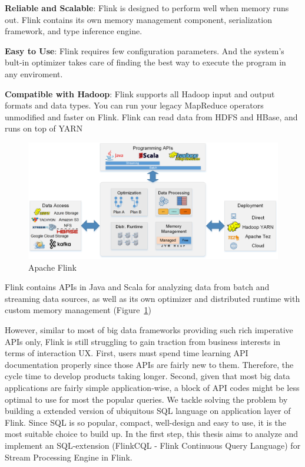\textbf{Reliable and Scalable}: Flink is designed to perform well when memory runs out.  Flink contains its own memory management component, serialization framework, and type inference engine.

\textbf{Easy to Use}: Flink requires few configuration parameters. And the system's bult-in optimizer takes care of finding the best way to execute the program in any enviroment.

\textbf{Compatible with Hadoop}: Flink supports all Hadoop input and output formats and data types. You can run your legacy MapReduce operators unmodified and faster on Flink. Flink can read data from HDFS and HBase, and runs on top of YARN

\begin{figure}[htbp!] 
\centering    
\includegraphics[width=1\textwidth]{ApacheFlink}
\caption{Apache Flink}
\label{fig:flink}
\end{figure}


Flink contains APIs in Java and Scala for analyzing data from batch and streaming data sources, as well as its own optimizer and distributed runtime with custom memory management (Figure~\ref{fig:flink})

However, similar to most of big data frameworks providing such rich imperative APIs only, Flink is still struggling to gain traction from business interests in terms of interaction UX.  First, users must spend time learning API documentation properly since those APIs are fairly new to them. Therefore, the cycle time to develop products taking longer. Second, given that most big data applications are fairly simple application-wise, a block of API codes might be less optimal to use for most the popular queries. We tackle solving the problem by building a extended version of ubiquitous SQL language on application layer of Flink. Since SQL is so popular, compact, well-design and easy to use, it is the most suitable choice to build up. In the first step, this thesis aims to analyze and implement an SQL-extension (FlinkCQL - Flink Continuous Query Language) for Stream Processing Engine in Flink.

